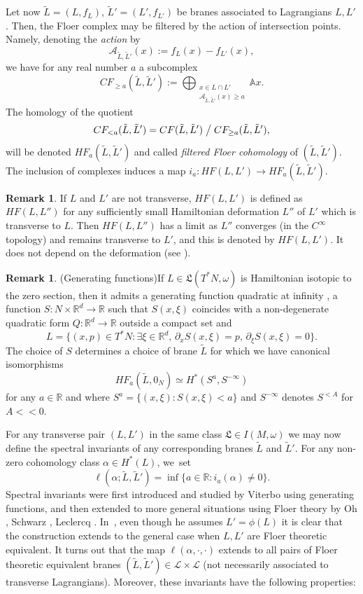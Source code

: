 \documentclass[JEP,XML,SOM,Unicode,NoFloatCountersInSection,published]{cedram}
\theoremstyle{definition}
\newtheorem{rem}[thm]{Remark}
\newcommand {\LL}{{\mathcal L}}
\newcommand{\R}{\mathbb{R}}
\newcommand{\fL}{\mathfrak {L}}
\begin{document}
Let now $\tilde L=(L,f_L)$, $\tilde L'=(L',f_{L'})$ be branes associated to Lagrangians $L, L'$. Then, the Floer complex may be filtered by the action of intersection points. Namely, denoting the \emph{action} by
\[
\mathcal A_{\tilde L,\tilde L'}(x):=f_{L}(x)-f_{L'}(x),
\]
we have for any real number $a$ a subcomplex
\[
CF_{\geq a}(\tilde L,\tilde L'):=\bigoplus_{\substack{x\in L\cap L'\\ \mathcal A_{\tilde L,\tilde L'}(x)\geq a}}\mathbb{A}x.
\]
The homology of the quotient
\[
CF_{<a}(\tilde L,\tilde L')=CF(\tilde L,\tilde L')\bigm/CF_{\geq a}(\tilde L,\tilde L'),
\]
will be denoted $HF_{a}(\tilde L,\tilde L')$ and called \emph{filtered Floer cohomology} of $(\tilde L,\tilde L')$. The inclusion of complexes induces a map $i_a:HF(L,L')\to HF_a(\tilde L,\tilde L')$.
\begin{rem}
If $L$ and $L'$ are not transverse, $HF(L,L')$ is defined as $HF(L,L'')$ for any sufficiently small Hamiltonian deformation $L''$ of $L'$ which is transverse to $L$. Then $HF(L,L'')$ has a limit as $L''$ converges (in the $C^\infty$ topology) and remains transverse to $L'$, and this is denoted by $HF(L,L')$. It does not depend on the deformation (see \eg \cite{Seidel}).
\end{rem}

\begin{rem}(Generating functions)\label{rem:generating-functions} If $L\in\fL(T^*N, \omega)$ is Hamiltonian isotopic to the zero section, then it admits a generating function quadratic at infinity \cite{Laudenbach-Sikorav}, \ie a function $S:N\times\R^d\to\R$ such that $S(x,\xi)$ coincides with a non-degenerate quadratic form $Q:\R^d\to\R$ outside a compact set and
\[
L=\bigl\{(x,p)\in T^*N: \exists \xi\in\R^d,\,\partial_xS(x,\xi)=p,\,\partial_\xi S(x,\xi)=0\bigr\}.
\]
The choice of $S$ determines a choice of brane $\tilde L$ for which we have canonical isomorphisms \cite{Viterbo-FCFH2, Milinkovic-equivalence, Milinkovic-Oh}
\[
HF_a(\tilde L,0_N)\simeq H^*(S^a,S^{-\infty})
\]
for any $a\in\R$ and where $S^{a}=\{(x,\xi):S(x,\xi)<a\}$ and $S^{-\infty}$ denotes $S^{<A}$ for $A<<0$.
\end{rem}

For any transverse pair $(L, L')$ in the same class $\fL\in I(M,\omega)$ we may now define the spectral invariants of any corresponding branes $\tilde L$ and $\tilde L'$. For any non-zero cohomology class $\alpha\in H^*(L)$, we~set
\[
\ell(\alpha;\tilde L,\tilde L')=\inf\{a\in\R : i_a(\alpha)\neq 0\}.
\]
Spectral invariants were first introduced and studied by Viterbo \cite{Viterbo-STAGGF} using generating functions, and then extended to more general situations using Floer theory by Oh \cite{Oh-action-functional-I}, Schwarz \cite{Schwarz}, Leclercq \cite{Leclercq}. In~\cite{Leclercq}, even though he assumes $L'=\phi(L)$ it is clear that the construction extends to the general case when $L, L'$ are Floer theoretic equivalent.
It turns out that the map $\ell(\alpha, \cdot, \cdot)$ extends to all pairs of Floer theoretic equivalent branes $(\tilde L,\tilde L')\in\LL\times \LL$ (not necessarily associated to transverse Lagrangians). Moreover, these invariants have the following properties:
\end{document}
